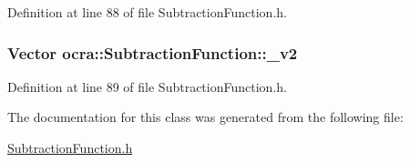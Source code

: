 Definition at line 88 of file Subtraction\+Function.\+h.

\subsubsection[{\texorpdfstring{\+\_\+v2}{_v2}}]{\setlength{\rightskip}{0pt plus 5cm}Vector ocra\+::\+Subtraction\+Function\+::\+\_\+v2\hspace{0.3cm}{\ttfamily [protected]}}\hypertarget{classocra_1_1SubtractionFunction_a10736fb0de7f83a54a09055251cf4ad5}{}\label{classocra_1_1SubtractionFunction_a10736fb0de7f83a54a09055251cf4ad5}


Definition at line 89 of file Subtraction\+Function.\+h.



The documentation for this class was generated from the following file\+:\begin{DoxyCompactItemize}
\item 
\hyperlink{SubtractionFunction_8h}{Subtraction\+Function.\+h}\end{DoxyCompactItemize}

